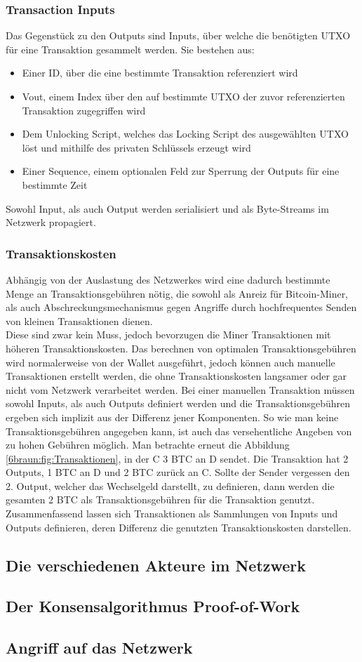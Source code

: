 \subsubsection{Transaction Inputs}
Das Gegenstück zu den Outputs sind Inputs, über welche die benötigten UTXO für eine Transaktion gesammelt werden. Sie bestehen aus:
\begin{itemize}
	\item Einer ID, über die eine bestimmte Transaktion referenziert wird
	\item Vout, einem Index über den auf bestimmte UTXO der zuvor referenzierten Transaktion zugegriffen wird
	\item Dem Unlocking Script, welches das Locking Script des ausgewählten UTXO löst und mithilfe des privaten Schlüssels erzeugt wird
	\item Einer Sequence, einem optionalen Feld zur Sperrung der Outputs für eine bestimmte Zeit
\end{itemize}
Sowohl Input, als auch Output werden serialisiert und als Byte-Streams im Netzwerk propagiert.\\
\subsubsection{Transaktionskosten}
Abhängig von der Auslastung des Netzwerkes wird eine dadurch bestimmte Menge an Transaktionsgebühren nötig, die sowohl als Anreiz für Bitcoin-Miner, als auch Abschreckungsmechanismus gegen Angriffe durch hochfrequentes Senden von kleinen Transaktionen dienen.\\
Diese sind zwar kein Muss, jedoch bevorzugen die Miner Transaktionen mit höheren Transaktionskosten. 
Das berechnen von optimalen Transaktionsgebühren wird normalerweise von der Wallet ausgeführt, jedoch können auch manuelle Transaktionen erstellt werden, die ohne Transaktionskosten langsamer oder gar nicht vom Netzwerk verarbeitet werden.
Bei einer manuellen Transaktion müssen sowohl Inputs, als auch Outputs definiert werden und die Transaktionsgebühren ergeben sich implizit aus der Differenz jener Komponenten. So wie man keine Transaktionsgebühren angegeben kann, ist auch das versehentliche Angeben von zu hohen Gebühren möglich. Man betrachte erneut die Abbildung \ref{6braun:fig:Transaktionen}, in der C 3 BTC an D sendet. Die Transaktion hat 2 Outputs, 1 BTC an D und 2 BTC zurück an C. Sollte der Sender vergessen den 2. Output, welcher das Wechselgeld darstellt, zu definieren, dann werden die gesamten 2 BTC als Transaktionsgebühren für die Transaktion genutzt.\\

Zusammenfassend lassen sich Transaktionen als Sammlungen von Inputs und Outputs definieren, deren Differenz die genutzten Transaktionskosten darstellen.
 
\subsection{Die verschiedenen Akteure im Netzwerk}
\subsection{Der Konsensalgorithmus Proof-of-Work}
\subsection{Angriff auf das Netzwerk}

